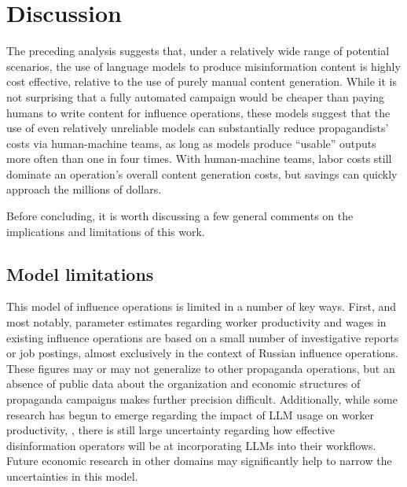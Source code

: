 \documentclass{article}
\begin{document}
\section{Discussion}
\label{sec:discussion}

The preceding analysis suggests that, under a relatively wide range of potential scenarios, the use of language models to produce misinformation content is highly cost effective, relative to the use of purely manual content generation. While it is not surprising that a fully automated campaign would be cheaper than paying humans to write content for influence operations, these models suggest that the use of even relatively unreliable models can substantially reduce propagandists' costs via human-machine teams, as long as models produce ``usable'' outputs more often than one in four times. With human-machine teams, labor costs still dominate an operation's overall content generation costs, but savings can quickly approach the millions of dollars. 

Before concluding, it is worth discussing a few general comments on the implications and limitations of this work.

\subsection{Model limitations}

This model of influence operations is limited in a number of key ways. First, and most notably, parameter estimates regarding worker productivity and wages in existing influence operations are based on a small number of investigative reports or job postings, almost exclusively in the context of Russian influence operations. These figures may or may not generalize to other propaganda operations, but an absence of public data about the organization and economic structures of propaganda campaigns makes further precision difficult. Additionally, while some research has begun to emerge regarding the impact of LLM usage on worker productivity, \cite{brynjolfsson, gptsasgpts, codemodels, mit, googleproductivity}, there is still large uncertainty regarding how effective disinformation operators will be at incorporating LLMs into their workflows. Future economic research in other domains may significantly help to narrow the uncertainties in this model.  
\end{document}
